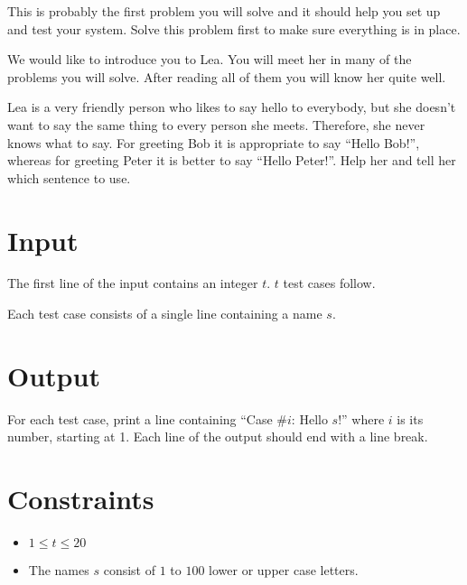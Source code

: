 

This is probably the first problem you will solve and it should help you set up and test your system. Solve this problem first to make sure everything is in place.

We would like to introduce you to Lea. You will meet her in many of the problems you will solve. After reading all of them you will know her quite well.

Lea is a very friendly person who likes to say hello to everybody, but she doesn't want to say the same thing to every person she meets. Therefore, she never knows what to say. For greeting Bob it is appropriate to say ``Hello Bob!'', whereas for greeting Peter it is better to say ``Hello Peter!''. Help her and tell her which sentence to use.

\section*{Input}

The first line of the input contains an integer $t$. $t$ test cases follow.%

Each test case consists of a single line containing a name $s$.

\section*{Output}

For each test case, print a line containing ``Case \#$i$: Hello $s$!'' where $i$ is its number, starting at 1. Each line of the output should end with a line break.

\section*{Constraints}
\begin{itemize}
	\item $1\leq t\leq 20$
	\item The names $s$ consist of $1$ to $100$ lower or upper case letters.
\end{itemize}
